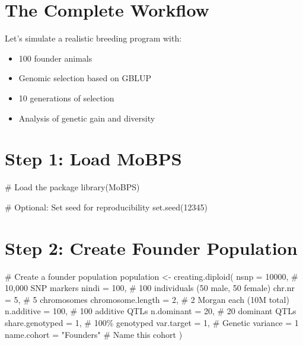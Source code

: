 \documentclass[
  letterpaper,
]{book}
\newenvironment{Shaded}{\begin{snugshade}}{\end{snugshade}}
\newcommand{\AttributeTok}[1]{\textcolor[rgb]{0.40,0.45,0.13}{#1}}
\newcommand{\CommentTok}[1]{\textcolor[rgb]{0.37,0.37,0.37}{#1}}
\newcommand{\DecValTok}[1]{\textcolor[rgb]{0.68,0.00,0.00}{#1}}
\newcommand{\FunctionTok}[1]{\textcolor[rgb]{0.28,0.35,0.67}{#1}}
\newcommand{\NormalTok}[1]{\textcolor[rgb]{0.00,0.23,0.31}{#1}}
\newcommand{\OtherTok}[1]{\textcolor[rgb]{0.00,0.23,0.31}{#1}}
\newcommand{\StringTok}[1]{\textcolor[rgb]{0.13,0.47,0.30}{#1}}
\providecommand{\tightlist}{%
  \setlength{\itemsep}{0pt}\setlength{\parskip}{0pt}}
\begin{document}
\section{The Complete Workflow}\label{the-complete-workflow}

Let's simulate a realistic breeding program with:

\begin{itemize}
\tightlist
\item
  100 founder animals
\item
  Genomic selection based on GBLUP
\item
  10 generations of selection
\item
  Analysis of genetic gain and diversity
\end{itemize}

\section{Step 1: Load MoBPS}\label{step-1-load-mobps}

\begin{Shaded}
\begin{Highlighting}[]
\CommentTok{\# Load the package}
\FunctionTok{library}\NormalTok{(MoBPS)}

\CommentTok{\# Optional: Set seed for reproducibility}
\FunctionTok{set.seed}\NormalTok{(}\DecValTok{12345}\NormalTok{)}
\end{Highlighting}
\end{Shaded}

\section{Step 2: Create Founder Population}\label{sec-create-founders}

\begin{Shaded}
\begin{Highlighting}[]
\CommentTok{\# Create a founder population}
\NormalTok{population }\OtherTok{\textless{}{-}} \FunctionTok{creating.diploid}\NormalTok{(}
  \AttributeTok{nsnp =} \DecValTok{10000}\NormalTok{,                }\CommentTok{\# 10,000 SNP markers}
  \AttributeTok{nindi =} \DecValTok{100}\NormalTok{,                 }\CommentTok{\# 100 individuals (50 male, 50 female)}
  \AttributeTok{chr.nr =} \DecValTok{5}\NormalTok{,                  }\CommentTok{\# 5 chromosomes}
  \AttributeTok{chromosome.length =} \DecValTok{2}\NormalTok{,       }\CommentTok{\# 2 Morgan each (10M total)}
  \AttributeTok{n.additive =} \DecValTok{100}\NormalTok{,            }\CommentTok{\# 100 additive QTLs}
  \AttributeTok{n.dominant =} \DecValTok{20}\NormalTok{,             }\CommentTok{\# 20 dominant QTLs}
  \AttributeTok{share.genotyped =} \DecValTok{1}\NormalTok{,         }\CommentTok{\# 100\% genotyped}
  \AttributeTok{var.target =} \DecValTok{1}\NormalTok{,              }\CommentTok{\# Genetic variance = 1}
  \AttributeTok{name.cohort =} \StringTok{"Founders"}     \CommentTok{\# Name this cohort}
\NormalTok{)}
\end{Highlighting}
\end{Shaded}
\end{document}
